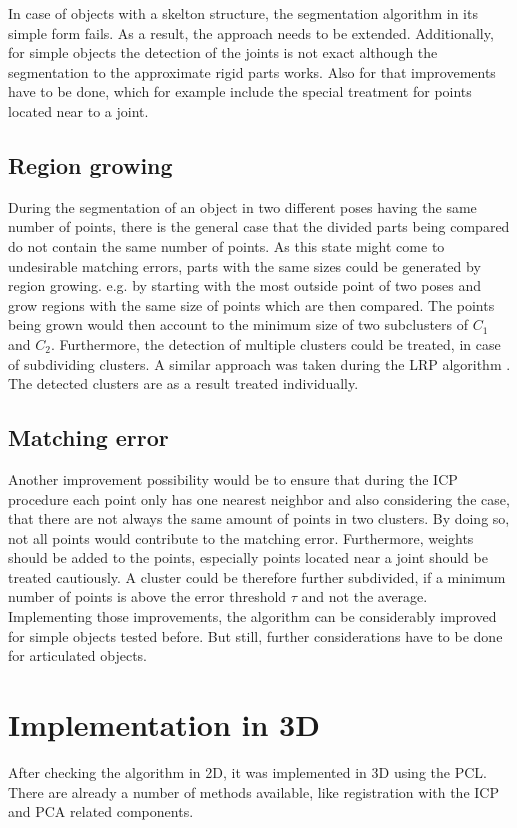In case of objects with a skelton structure, the segmentation algorithm in its simple form fails. As a result, the approach needs to be extended. Additionally, for simple objects the detection of the joints is not exact although the segmentation to the approximate rigid parts works. Also for that improvements have to be done, which for example include the special treatment for points located near to a joint.

\section{Region growing}
During the segmentation of an object in two different poses having the same number of points, there is the general case that the divided parts being compared do not contain the same number of points. As this state might come to undesirable matching errors, parts with the same sizes could be generated by region growing. e.g. by starting with the most outside point of two poses and grow regions with the same size of points which are then compared. The points being grown would then account to the minimum size of two subclusters of $C_1$ and $C_2$. Furthermore, the detection of multiple clusters could be treated, in case of subdividing clusters. A similar approach was taken during the LRP algorithm \cite{guo2016correspondence}. The detected clusters are as a result treated individually.

\section{Matching error}
Another improvement possibility would be to ensure that during the ICP procedure each point only has one nearest neighbor and also considering the case, that there are not always the same amount of points in two clusters. By doing so, not all points would contribute to the matching error. Furthermore, weights should be added to the points, especially points located near a joint should be treated cautiously. A cluster could be therefore further subdivided, if a minimum number of points is above the error threshold $\tau$ and not the average. 
Implementing those improvements, the algorithm can be considerably improved for simple objects tested before. But still, further considerations have to be done for articulated objects.


\chapter{Implementation in 3D}

After checking the algorithm in 2D, it was implemented in 3D using the PCL. There are already a number of methods available, like registration with the ICP and PCA related components.